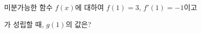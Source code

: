 미분가능한 함수 $f(x)$에 대하여 $f(1)=3$, $f'(1)=-1$이고\par\smallskip{}\par\smallskip\noindent 가 성립할 때, $g(1)$의 값은? 
